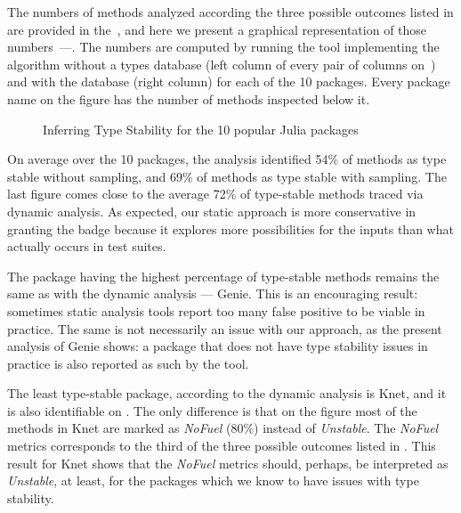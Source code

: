 The numbers of methods analyzed according the three possible outcomes listed in
 are provided in the~, and here
we present a graphical representation of those
numbers~---. The numbers are computed by running the
tool implementing the algorithm without a types database (left column of every
pair of columns on~) and with the database (right
column) for each of the 10 packages. Every package name on the figure has the number of
methods inspected below it.

\begin{figure}[ht]
\caption{Inferring Type Stability for the 10 popular Julia packages}%
\label{figs:approx:eval}
\end{figure}

On average over the 10 packages, the analysis identified 54\% of methods as type
stable without sampling, and 69\% of methods as type stable with sampling. The
last figure comes close to the average 72\% of type-stable methods traced via
dynamic analysis. As expected, our static approach is more conservative in granting the
badge because it explores more possibilities for the inputs than what actually
occurs in test suites.

The package having the highest percentage of type-stable methods remains the same as
with the dynamic analysis --- Genie. This is an encouraging result: sometimes static
analysis tools report too many false positive to be viable in practice.
The same is not necessarily an issue with our approach, as
the present analysis of Genie shows: a package that does not have type stability
issues in practice is also reported as such by the tool.

The least type-stable package, according to the dynamic analysis is Knet, and it
is also identifiable on . The only difference is that
on the figure most of the methods in Knet are marked as \emph{NoFuel} (80\%)
instead of \emph{Unstable}. The \emph{NoFuel} metrics corresponds to the third
of the three possible outcomes listed in . This
result for Knet shows that the \emph{NoFuel} metrics should, perhaps, be
interpreted as \emph{Unstable}, at least, for the packages which we know to have issues
with type stability.

